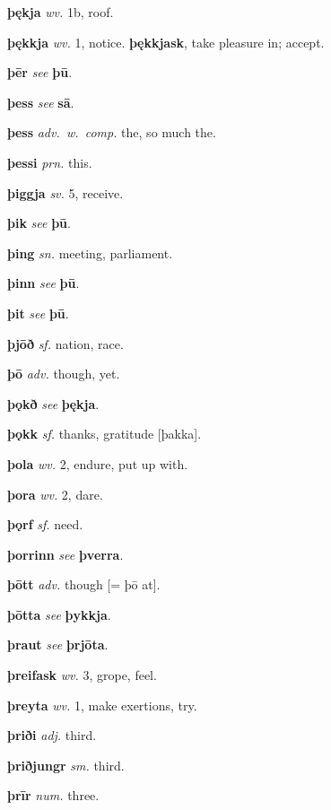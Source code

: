 \documentclass[12pt,letterpaper]{book}
\begin{document}
\noindent
\textbf{þękja} \textit{wv.} 1b, roof.

\noindent
\textbf{þękkja} \textit{wv.} 1, notice.  \textbf{þękkjask}, take pleasure
	in; accept.

\noindent
\textbf{þēr} \textit{} \textit{see} \textbf{þū}.

\noindent
\textbf{þess} \textit{} \textit{see} \textbf{sā}.

\noindent
\textbf{þess} \textit{adv.\ w.\ comp.} the, so much the.

\noindent
\textbf{þessi} \textit{prn.} this.

\noindent
\textbf{þiggja} \textit{sv.} 5, receive.

\noindent
\textbf{þik} \textit{} \textit{see} \textbf{þū}.

\noindent
\textbf{þing} \textit{sn.} meeting, parliament.

\noindent
\textbf{þinn} \textit{} \textit{see} \textbf{þū}.

\noindent
\textbf{þit} \textit{} \textit{see} \textbf{þū}.

\noindent
\textbf{þjōð} \textit{sf.} nation, race.

\noindent
\textbf{þō} \textit{adv.} though, yet.

\noindent
\textbf{þǫkð} \textit{} \textit{see} \textbf{þękja}.

\noindent
\textbf{þǫkk} \textit{sf.} thanks, gratitude [þakka].

\noindent
\textbf{þola} \textit{wv.} 2, endure, put up with.

\noindent
\textbf{þora} \textit{wv.} 2, dare.

\noindent
\textbf{þǫrf} \textit{sf.} need.

\noindent
\textbf{þorrinn} \textit{} \textit{see} \textbf{þverra}.

\noindent
\textbf{þōtt} \textit{adv.} though [= þō at].

\noindent
\textbf{þōtta} \textit{} \textit{see} \textbf{þykkja}.

\noindent
\textbf{þraut} \textit{} \textit{see} \textbf{þrjōta}.

\noindent
\textbf{þreifask} \textit{wv.} 3, grope, feel.

\noindent
\textbf{þreyta} \textit{wv.} 1, make exertions, try.

\noindent
\textbf{þriði} \textit{adj.} third.

\noindent
\textbf{þriðjungr} \textit{sm.} third.

\noindent
\textbf{þrīr} \textit{num.} three.
\end{document}
